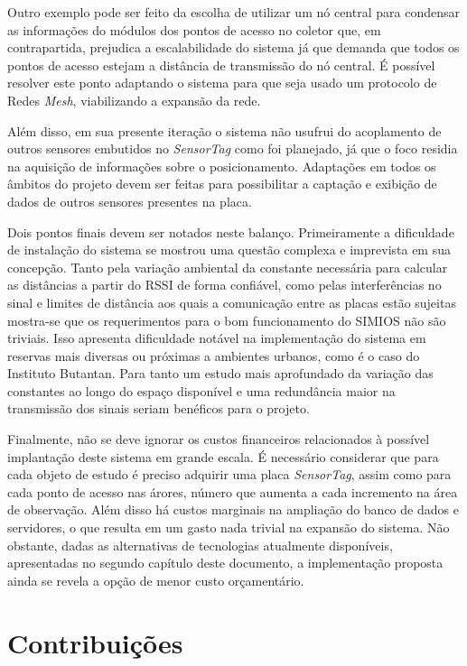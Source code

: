 Outro exemplo pode ser feito da escolha de utilizar um nó central para condensar as informações do módulos dos pontos de acesso no coletor que, em contrapartida, prejudica a escalabilidade do sistema já que demanda que todos os pontos de acesso estejam a distância de transmissão do nó central. É possível resolver este ponto adaptando o sistema para que seja usado um protocolo de Redes \emph{Mesh}, viabilizando a expansão da rede.

Além disso, em sua presente iteração o sistema não usufrui do acoplamento de outros sensores embutidos no \emph{SensorTag} como foi planejado, já que o foco residia na aquisição de informações sobre o posicionamento. Adaptações em todos os âmbitos do projeto devem ser feitas para possibilitar a captação e exibição de dados de outros sensores presentes na placa.

Dois pontos finais devem ser notados neste balanço. Primeiramente a dificuldade de instalação do sistema se mostrou uma questão complexa e imprevista em sua concepção. Tanto pela variação ambiental da constante necessária para calcular as distâncias a partir do RSSI de forma confiável, como pelas interferências no sinal e limites de distância aos quais a comunicação entre as placas estão sujeitas mostra-se que os requerimentos para o bom funcionamento do SIMIOS não são triviais. Isso apresenta dificuldade notável na implementação do sistema em reservas mais diversas ou próximas a ambientes urbanos, como é o caso do Instituto Butantan. Para tanto um estudo mais aprofundado da variação das constantes ao longo do espaço disponível e uma redundância maior na transmissão dos sinais seriam benéficos para o projeto.

Finalmente, não se deve ignorar os custos financeiros relacionados à possível implantação deste sistema em grande escala. É necessário considerar que para cada objeto de estudo é preciso adquirir uma placa \emph{SensorTag}, assim como para cada ponto de acesso nas árores, número que aumenta a cada incremento na área de observação. Além disso há custos marginais na ampliação do banco de dados e servidores, o que resulta em um gasto nada trivial na expansão do sistema. Não obstante, dadas as alternativas de tecnologias atualmente disponíveis, apresentadas no segundo capítulo deste documento, a implementação proposta ainda se revela a opção de menor custo orçamentário.

\section{Contribuições}

